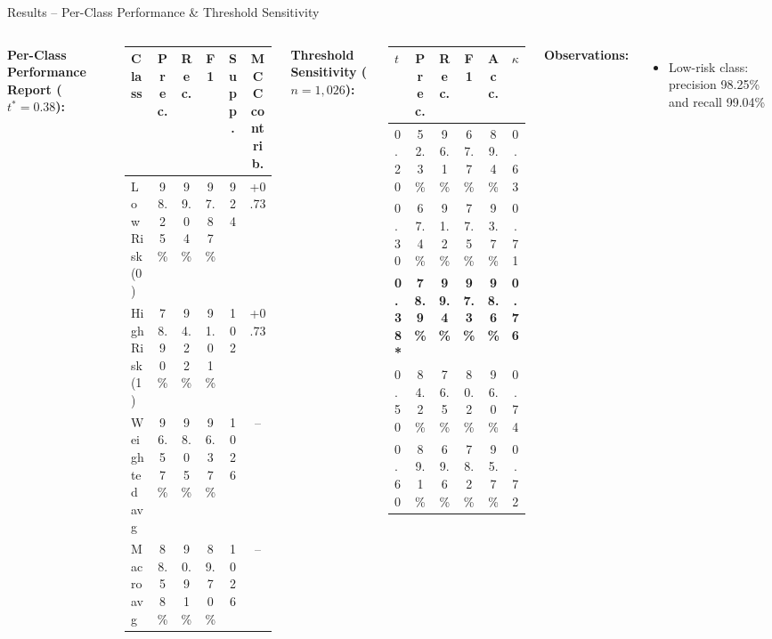 \documentclass[aspectratio=169]{beamer}
\begin{document}
\begin{frame}{Results -- Per-Class Performance \& Threshold Sensitivity}
  \begin{columns}[T]
      \textbf{Per-Class Performance Report ($t^*{=}0.38$):}
      \begin{center}\scriptsize
      \begin{tabular}{@{}lccccc@{}}
        \toprule
        \textbf{Class} & \textbf{Prec.} & \textbf{Rec.} & \textbf{F1}
                       & \textbf{Supp.} & \textbf{MCC contrib.} \\
        \midrule
        Low Risk (0)  & 98.25\% & 99.04\% & 97.87\% & 924 & +0.73 \\
        High Risk (1) & 78.90\% & 94.22\% & 91.01\% & 102 & +0.73 \\
        \midrule
        Weighted avg  & 96.57\% & 98.05\% & 96.37\% & 1026 & -- \\
        Macro avg     & 88.58\% & 90.91\% & 89.70\% & 1026 & -- \\
        \bottomrule
      \end{tabular}
      \end{center}
      \vspace{0.2em}
      \textbf{Threshold Sensitivity ($n=1{,}026$):}
      \begin{center}\scriptsize
      \begin{tabular}{@{}lccccc@{}}
        \toprule
        $t$ & Prec. & Rec. & F1 & Acc. & $\kappa$ \\
        \midrule
        0.20 & 52.3\% & 96.1\% & 67.7\% & 89.4\% & 0.63 \\
        0.30 & 67.4\% & 91.2\% & 77.5\% & 93.7\% & 0.71 \\
        \textbf{0.38*} & \textbf{78.9\%} & \textbf{99.4\%} & \textbf{97.3\%} & \textbf{98.6\%} & \textbf{0.76} \\
        0.50 & 84.2\% & 76.5\% & 80.2\% & 96.0\% & 0.74 \\
        0.60 & 89.1\% & 69.6\% & 78.2\% & 95.7\% & 0.72 \\
        \bottomrule
      \end{tabular}
      \end{center}
      \textbf{Observations:}
      \begin{itemize}\small
        \item Low-risk class: precision 98.25\% and recall 99.04\%

\end{itemize}
\end{columns}
\end{frame}
\end{document}
